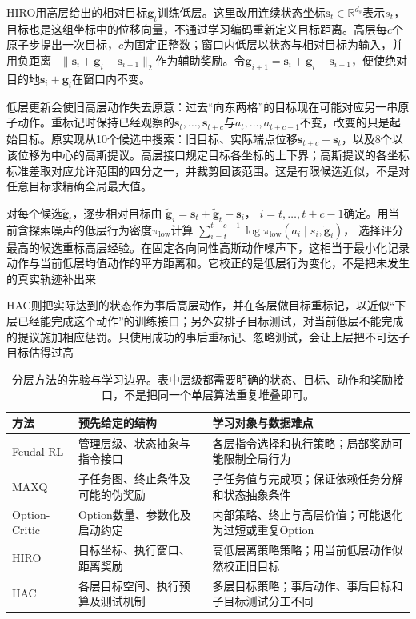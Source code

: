 HIRO用高层给出的相对目标$\bm g_t$训练低层。这里改用连续状态坐标$\bm s_t\in\mathbb R^{d_s}$表示$s_t$，目标也是这组坐标中的位移向量，不通过学习编码重新定义目标距离。高层每$c$个原子步提出一次目标，$c$为固定正整数；窗口内低层以状态与相对目标为输入，并用负距离$-\lVert\bm s_i+\bm g_i-\bm s_{i+1}\rVert_2$作为辅助奖励。令$\bm g_{i+1}=\bm s_i+\bm g_i-\bm s_{i+1}$，便使绝对目的地$\bm s_i+\bm g_i$在窗口内不变。

低层更新会使旧高层动作失去原意：过去“向东两格”的目标现在可能对应另一串原子动作。重标记时保持已经观察的$\bm s_t,\ldots,\bm s_{t+c}$与$a_t,\ldots,a_{t+c-1}$不变，改变的只是起始目标。原实现从10个候选中搜索：旧目标、实际端点位移$\bm s_{t+c}-\bm s_t$，以及8个以该位移为中心的高斯提议。高层接口规定目标各坐标的上下界；高斯提议的各坐标标准差取对应允许范围的四分之一，并裁剪回该范围。这是有限候选近似，不是对任意目标求精确全局最大值。

对每个候选$\widetilde{\bm g}_t$，逐步相对目标由
$\widetilde{\bm g}_i=\bm s_t+\widetilde{\bm g}_t-\bm s_i$，
$i=t,\ldots,t+c-1$确定。用当前含探索噪声的低层行为密度$\pi_{\mathrm{low}}$计算
$\sum_{i=t}^{t+c-1}\log\pi_{\mathrm{low}}
(a_i\mid s_i,\widetilde{\bm g}_i)$，
选择评分最高的候选重标高层经验。在固定各向同性高斯动作噪声下，这相当于最小化记录动作与当前低层均值动作的平方距离和。它校正的是低层行为变化，不是把未发生的真实轨迹补出来

HAC则把实际达到的状态作为事后高层动作，并在各层做目标重标记，以近似“下层已经能完成这个动作”的训练接口；另外安排子目标测试，对当前低层不能完成的提议施加相应惩罚。只使用成功的事后重标记、忽略测试，会让上层把不可达子目标估得过高

\begin{table}[t]
  \centering
  \small
  \begin{tabularx}{\linewidth}{>{\raggedright\arraybackslash}p{22mm} >{\raggedright\arraybackslash}X >{\raggedright\arraybackslash}X}
    \toprule
    方法 & 预先给定的结构 & 学习对象与数据难点 \\
    \midrule
    Feudal RL & 管理层级、状态抽象与指令接口 & 各层指令选择和执行策略；局部奖励可能限制全局行为 \\
    MAXQ & 子任务图、终止条件及可能的伪奖励 & 子任务值与完成项；保证依赖任务分解和状态抽象条件 \\
    Option-Critic & Option数量、参数化及启动约定 & 内部策略、终止与高层价值；可能退化为过短或重复Option \\
    HIRO & 目标坐标、执行窗口、距离奖励 & 高低层离策略策略；用当前低层动作似然校正旧目标 \\
    HAC & 各层目标空间、执行预算及测试机制 & 多层目标策略；事后动作、事后目标和子目标测试分工不同 \\
    \bottomrule
  \end{tabularx}
  \caption{分层方法的先验与学习边界。表中层级都需要明确的状态、目标、动作和奖励接口，不是把同一个单层算法重复堆叠即可。}
  \label{tab:rl-learning-hierarchy-methods}
\end{table}


